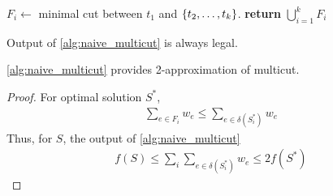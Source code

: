 \begin{algorithm}
	\caption{}\label{alg:naive_multicut}
	\begin{algorithmic}[1]
		\State $F_i \gets$ minimal cut between $t_1$ and $\qty{t_2,\dots, t_k}$.
		\EndFor
		\State \textbf{return} $\bigcup_{i=1}^k F_i$
		\EndProcedure
	\end{algorithmic}
\end{algorithm}

\begin{lemma}
	Output of \vref{alg:naive_multicut} is always legal.
\end{lemma}
\begin{lemma}
\vref{alg:naive_multicut} provides 2-approximation of multicut.
\begin{proof}
	For optimal solution $S^*$,
	\begin{align}
	\sum_{e\in F_i} w_e \leq \sum_{e\in \delta(S^*_i)} w_e
	\end{align}
	Thus, for $S$, the output of \vref{alg:naive_multicut} 
	\begin{align}
	f(S)  \leq \sum_i \sum_{e\in \delta(S^*_i)} w_e \leq 2f(S^*)
	\end{align}
\end{proof}
\end{lemma}
